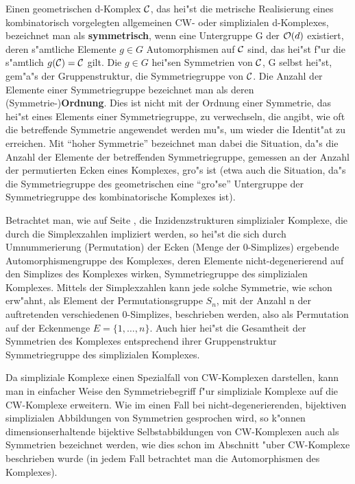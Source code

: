 Einen geometrischen d-Komplex $\cal C$, das hei"st die metrische Realisierung
eines kombinatorisch vorgelegten allgemeinen CW- oder simplizialen d-Komplexes,
bezeichnet man als {\bf symmetrisch},
wenn eine Untergruppe G der ${\cal O}(d)$ existiert, deren s"amtliche
Elemente $g\in G$ Automorphismen auf $\cal C$ sind, das hei"st f"ur die
s"amtlich $g({\cal C}) = {\cal C}$ gilt. Die $g\in G$ hei"sen Symmetrien
von $\cal C$, G selbst hei"st, gem"a"s der Gruppenstruktur, die Symmetriegruppe
 von $\cal C$.
Die Anzahl der Elemente einer Symmetriegruppe bezeichnet man als deren
(Symmetrie-){\bf Ordnung}. Dies ist nicht mit der Ordnung einer Symmetrie, das
hei"st eines Elements einer Symmetriegruppe, zu verwechseln, die angibt, wie oft
die betreffende Symmetrie angewendet werden mu"s, um wieder die Identit"at zu
erreichen. Mit "`hoher Symmetrie"' bezeichnet man dabei die Situation, da"s
die Anzahl der Elemente der betreffenden Symmetriegruppe, gemessen an
der Anzahl der permutierten Ecken eines Komplexes, gro"s ist
 (etwa auch die Situation, da"s die Symmetriegruppe des
geometrischen eine "`gro"se"' Untergruppe der Symmetriegruppe des kombinatorische
Komplexes ist).

Betrachtet man, wie auf Seite \pageref{symm}, die Inzidenzstrukturen
simplizialer Komplexe, die durch die Simplexzahlen impliziert werden, so
hei"st die sich durch Umnummerierung (Permutation) der Ecken (Menge der
0-Simplizes) ergebende Automorphismengruppe des Komplexes, deren Elemente
nicht-degenerierend auf den Simplizes des Komplexes wirken, Symmetriegruppe
des simplizialen Komplexes.
Mittels der Simplexzahlen kann jede solche Symmetrie, wie schon erw"ahnt,
als Element der Permutationsgruppe $S_n$, mit der Anzahl n der auftretenden
verschiedenen 0-Simplizes, beschrieben werden, also als Permutation auf der
Eckenmenge $E=\{1,\ldots,n\}$. Auch hier hei"st die Gesamtheit der Symmetrien
des Komplexes entsprechend ihrer Gruppenstruktur Symmetriegruppe des
simplizialen Komplexes.

Da simpliziale Komplexe einen Spezialfall von CW-Komplexen darstellen, kann
man in einfacher Weise den Symmetriebegriff f"ur simpliziale Komplexe
auf die CW-Komplexe erweitern. Wie im einen Fall bei nicht-degenerierenden,
bijektiven simplizialen Abbildungen von Symmetrien gesprochen wird, so k"onnen
dimensionserhaltende bijektive Selbstabbildungen von CW-Komplexen auch als
Symmetrien bezeichnet werden, wie dies schon im Abschnitt "uber CW-Komplexe
beschrieben wurde (in jedem Fall betrachtet man die Automorphismen des
Komplexes).

